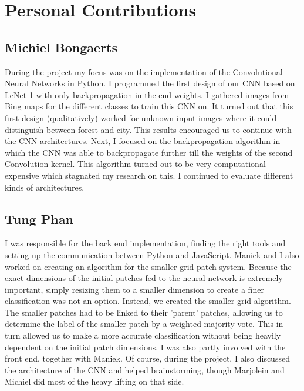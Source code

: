 \documentclass[a4paper,onecolumn]{report}
\begin{document}
\chapter{Personal Contributions}
\label{personalcontributions}
\section{Michiel Bongaerts}
During the project my focus was on the implementation of the Convolutional Neural Networks in Python. I programmed the first design of our CNN based on LeNet-1 with only backpropagation in the end-weights. I gathered images from Bing maps for the different classes to train this CNN on. It turned out that this first design (qualitatively) worked for unknown input images where it could distinguish between forest and city. This results encouraged us to continue with the CNN architectures. Next, I focused on the backpropagation algorithm in which the CNN was able to backpropagate further till the weights of the second Convolution kernel. This algorithm turned out to be very computational expensive which stagnated my research on this. I continued to evaluate different kinds of architectures. 

\section{Tung Phan}
I was responsible for the back end implementation, finding the right tools and setting up the communication between Python and JavaScript. Maniek and I also worked on creating an algorithm for the smaller grid patch system. Because the exact dimensions of the initial patches fed to the neural network is extremely important, simply resizing them to a smaller dimension to create a finer classification was not an option. Instead, we created the smaller grid algorithm. The smaller patches had to be linked to their 'parent' patches, allowing us to determine the label of the smaller patch by a weighted majority vote. This in turn allowed us to make a more accurate classification without being heavily dependent on the initial patch dimensions. I was also partly involved with the front end, together with Maniek. Of course, during the project, I also discussed the architecture of the CNN and helped brainstorming, though Marjolein and Michiel did most of the heavy lifting on that side.
\end{document}

